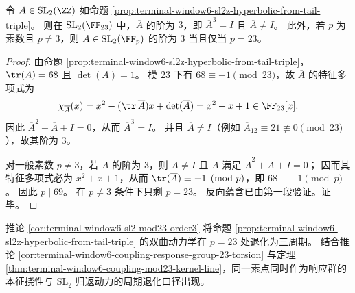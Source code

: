 \begin{corollary}\label{cor:terminal-window6-sl2-mod23-order3}
令 \(A\in\mathrm{SL}_2(\ZZ)\) 如命题 \ref{prop:terminal-window6-sl2z-hyperbolic-from-tail-triple}。
则在 \(\mathrm{SL}_2(\FF_{23})\) 中，\(\overline A\) 的阶为 \(3\)，即 \(\overline A^3=I\) 且 \(\overline A\neq I\)。
此外，若 \(p\) 为素数且 \(p\neq 3\)，则 \(\overline A\in\mathrm{SL}_2(\FF_p)\) 的阶为 \(3\) 当且仅当 \(p=23\)。
\end{corollary}
\begin{proof}
由命题 \ref{prop:terminal-window6-sl2z-hyperbolic-from-tail-triple}，
\(\tr(A)=68\) 且 \(\det(A)=1\)。
模 \(23\) 下有 \(68\equiv -1\pmod{23}\)，故 \(\overline A\) 的特征多项式为
\[
\chi_{\overline A}(x)=x^2-(\tr\,\overline A)x+\det(\overline A)=x^2+x+1\in\FF_{23}[x].
\]
因此 \(\overline A^2+\overline A+I=0\)，从而 \(\overline A^3=I\)。
并且 \(\overline A\neq I\)（例如 \(\overline A_{12}\equiv 21\not\equiv 0\pmod{23}\)），故其阶为 \(3\)。
\par
对一般素数 \(p\neq 3\)，若 \(\overline A\) 的阶为 \(3\)，则 \(\overline A\neq I\) 且 \(\overline A\) 满足 \(\overline A^2+\overline A+I=0\)；
因而其特征多项式必为 \(x^2+x+1\)，从而 \(\tr(\overline A)\equiv -1\pmod p\)，即 \(68\equiv -1\pmod p\)。
因此 \(p\mid 69\)。
在 \(p\neq 3\) 条件下只剩 \(p=23\)。
反向蕴含已由第一段验证。证毕。
\end{proof}

\begin{remark}\label{rem:terminal-window6-mod23-period3-collapse}
推论 \ref{cor:terminal-window6-sl2-mod23-order3} 将命题 \ref{prop:terminal-window6-sl2z-hyperbolic-from-tail-triple} 的双曲动力学在 \(p=23\) 处退化为三周期。
结合推论 \ref{cor:terminal-window6-coupling-response-group-23-torsion} 与定理 \ref{thm:terminal-window6-coupling-mod23-kernel-line}，同一素点同时作为响应群的本征挠性与 \(\mathrm{SL}_2\) 归返动力的周期退化口径出现。
\end{remark}

